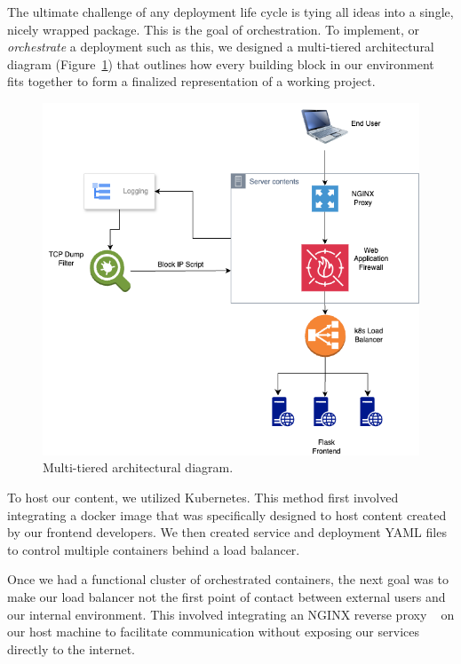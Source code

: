The ultimate challenge of any deployment life cycle is tying all ideas into a single, nicely wrapped package. This is the goal of orchestration.
To implement, or \textit{orchestrate} a deployment such as this, we designed a multi-tiered architectural diagram (Figure~\ref{fig:architecture})
that outlines how every building block in our environment fits together to form a finalized representation of a working project. 

\begin{figure}[h]
    \centering
    \includegraphics[width=\columnwidth]{resources/diagram.png} 
    \caption{Multi-tiered architectural diagram.}
    \label{fig:architecture}
\end{figure}

To host our content, we utilized Kubernetes. This method first involved integrating a docker image that was specifically designed to host content created by our frontend developers. We then created service and deployment YAML files to control multiple containers behind a load balancer. 

Once we had a functional cluster of orchestrated containers, the next goal was to make our load balancer not the first point of contact between external users and our internal environment. 
This involved integrating an NGINX reverse proxy ~\cite{nginx} on our host machine to facilitate communication without exposing our services directly to the internet. 

